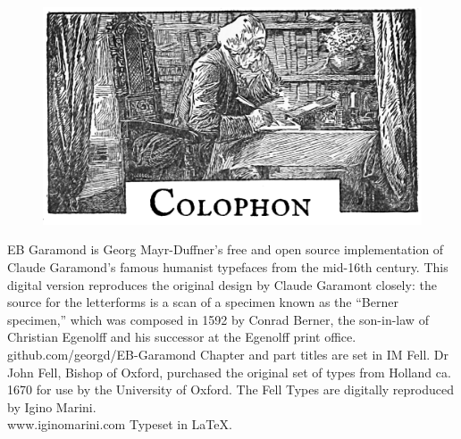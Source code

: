 \documentclass[
paper=5.5in:8.5in,
BCOR=7mm,
twoside,
DIV=calc,
12pt,
usegeometry,
chapterprefix,
headings=big]{scrbook} %
\begin{document}











\clearpage
{}
\begin{figure}[t!]
\centering
\includegraphics[width=\linewidth]{colophon}
\end{figure}
\centering
EB Garamond is Georg Mayr-Duffner's free and open source implementation of Claude Garamond’s famous humanist typefaces from the mid-16th century. This digital version reproduces the original design by Claude Garamont closely: the source for the letterforms is a scan of a specimen known as the \enquote{Berner specimen,} which was composed in 1592 by Conrad Berner, the son-in-law of Christian Egenolff and his successor at the Egenolff print office.  \\github.com/georgd/EB-Garamond
\vfill
Chapter and part titles are set in IM Fell. Dr John Fell, Bishop of Oxford, purchased the original set of types from Holland ca. 1670 for use by the University of Oxford. The Fell Types are digitally reproduced by Igino Marini. \\www.iginomarini.com
\vfill
Typeset in \LaTeX{}.
\thispagestyle{empty}
\end{document}
